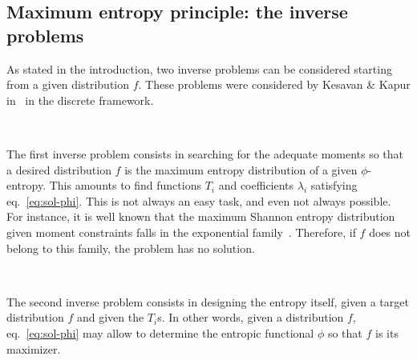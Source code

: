 \documentclass[entropy,article,submit,moreauthors,pdftex]{Definitions/mdpi}
\begin{document}

\subsection{Maximum entropy principle: the inverse problems}
\label{subsec:MaxPhiEntInverse}

As stated in  the introduction, two inverse problems can  be considered starting
from a  given distribution  $f$. These  problems were  considered by  Kesavan \&
Kapur in~\cite{KesKap89} in the discrete framework.

\

The first inverse problem consists in searching for the adequate moments so that
a  desired distribution  $f$  is the  maximum entropy  distribution  of a  given
$\phi$-entropy.   This   amounts  to  find  functions   $T_i$  and  coefficients
$\lambda_i$ satisfying eq.~\eqref{eq:sol-phi}.  This is not always an easy task,
and even not  always possible. For instance,  it is well known  that the maximum
Shannon entropy distribution  given moment constraints falls  in the exponential
family~\cite{CovTho06, BorLew91:05, Arn01, MezMon09}. Therefore, if $f$ does not
belong to this family, the problem has no solution.


\

The second  inverse problem consists  in designing  the entropy itself,  given a
target  distribution  $f$  and  given  the $T_i$s.   In  other  words,  given  a
distribution  $f$, eq.~\eqref{eq:sol-phi}  may allow  to determine  the entropic
functional $\phi$ so that $f$ is its maximizer.
\end{document}
